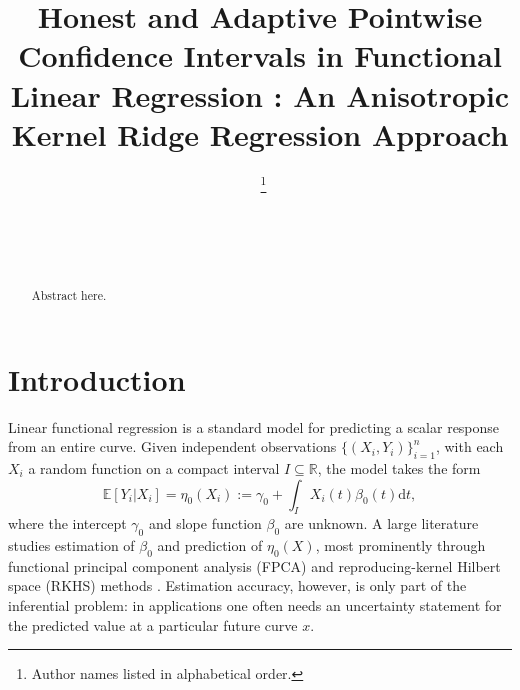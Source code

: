 \documentclass[aos]{imsart}
\newcommand{\ud}{\mathrm d}
\theoremstyle{plain}
\theoremstyle{definition}
\theoremstyle{definition}
\begin{document}
\begin{frontmatter}
\title{Honest and Adaptive Pointwise Confidence Intervals in Functional Linear Regression : An Anisotropic Kernel Ridge Regression Approach}

\begin{aug}
\author[A]{~\thanks{Author names listed in alphabetical order.}}
\author[B]{~}
\author[B]{~}

\address[A]{Marshall School of Business,
University of Southern California}

\address[B]{Naveen Jindal School of Management,
University of Texas at Dallas}
\end{aug}

\begin{abstract}
Abstract here.
\end{abstract}

\begin{keyword}[class=MSC2020]
\end{keyword}

\begin{keyword}
\end{keyword}

\end{frontmatter}

\section{Introduction}

Linear functional regression is a standard model for predicting a scalar response from an entire curve. Given independent observations $\{(X_i,Y_i)\}_{i=1}^n$, with each $X_i$ a random function on a compact interval $I\subseteq\mathbb R$, the model takes the form
\begin{equation}
\mathbb E[Y_i|X_i] = \eta_0(X_i) := \gamma_0 + \int_I X_i(t)\beta_0(t)\ud t,
\label{eq:model}
\end{equation}
where the intercept $\gamma_0$ and slope function $\beta_0$ are unknown. A large literature studies estimation of $\beta_0$ and prediction of $\eta_0(X)$, most prominently through functional principal component analysis (FPCA) \citep[Chapter 8]{ramsay2005functional,cai2006prediction} and reproducing-kernel Hilbert space (RKHS) methods \citep{yuan2010reproducing,cai2012minimax}. Estimation accuracy, however, is only part of the inferential problem: in applications one often needs an uncertainty statement for the predicted value at a particular future curve $x$.
\end{document}
